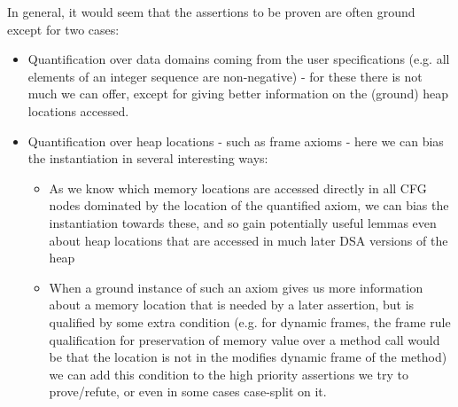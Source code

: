 	In general, it would seem that the assertions to be proven are often ground except for two cases:
	\begin{itemize}
		\item Quantification over data domains coming from the user specifications (e.g. all elements of an integer sequence are non-negative) - for these there is not much we can offer, except for giving better information on the (ground) heap locations accessed.
		\item Quantification over heap locations - such as frame axioms - here we can bias the instantiation in several interesting ways:
		\begin{itemize}
			\item As we know which memory locations are accessed directly in all CFG nodes dominated by the location of the quantified axiom, we can bias the instantiation towards these, and so gain potentially useful lemmas even about  heap locations that are accessed in much later DSA versions of the heap
			\item When a ground instance of such an axiom gives us more information about a memory location that is needed by a later assertion, but is qualified by some extra condition (e.g. for dynamic frames, the frame rule qualification for preservation of memory value over a method call would be that the location is not in the modifies dynamic frame of the method) we can add this condition to the high priority assertions we try to prove/refute, or even in some cases case-split on it.
		\end{itemize}
	\end{itemize}
		
